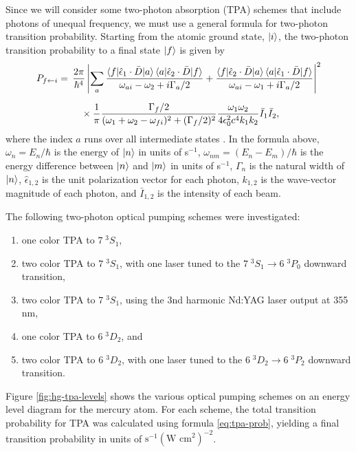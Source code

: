 \documentclass[12pt]{mitthesis}
\begin{document}
Since we will consider some two-photon absorption (TPA) schemes that
include photons of unequal frequency, we must use a general formula
for two-photon transition probability.  Starting from the atomic
ground state, $\mathinner{|{i}\rangle}$, the two-photon transition probability to a
final state $\mathinner{|{f}\rangle}$ is given by
\begin{equation}
  \label{eq:tpa-prob}
  \begin{split}
    P_{f \leftarrow i} = &\: \: \frac{2 \pi}{\hbar^4}
    \left \lvert
      \sum_a
      \frac{
        \mathinner{\langle{f|\hat{\epsilon}_1 \cdot \bar{D}|a}\rangle}\mathinner{\langle{a|\hat{\epsilon}_2 \cdot \bar{D}|f}\rangle}
      }{
        \omega_{ai} - \omega_2 + i \Gamma_a / 2
      } + \frac{
        \mathinner{\langle{f|\hat{\epsilon}_2 \cdot \bar{D}|a}\rangle}\mathinner{\langle{a|\hat{\epsilon}_1 \cdot \bar{D}|f}\rangle}
      }{
        \omega_{ai} - \omega_1 + i \Gamma_a / 2
      }
    \right \rvert ^2\\[2mm]
    & \: \: \: \: \: \: \times 
      \frac{1}{\pi} 
      \frac{
        \Gamma_f / 2
      }{
        (\omega_1 + \omega_2 - \omega_{fi})^2+(\Gamma_f/2)^2
      } \frac{
        \omega_1 \omega_2
      }{
        4 \epsilon_0^2 c^4 k_1 k_2
      } \bar{I}_1 \bar{I}_2,\\
  \end{split}
\end{equation}
where the index $a$ runs over all intermediate states \cite{bonin84,
  grynberg77}.  In the formula above, $\omega_n = E_n / \hbar$ is the
energy of $\mathinner{|{n}\rangle}$ in units of s$^{-1}$, $\omega_{nm} = (E_n -
E_m)/\hbar$ is the energy difference between $\mathinner{|{n}\rangle}$ and $\mathinner{|{m}\rangle}$
in units of s$^{-1}$, $\Gamma_n$ is the natural width of $\mathinner{|{n}\rangle}$,
$\hat{\epsilon}_{1,2}$ is the unit polarization vector for each
photon, $k_{1,2}$ is the wave-vector magnitude of each photon, and
$\bar{I}_{1,2}$ is the intensity of each beam.

The following two-photon optical pumping schemes were investigated: 
\renewcommand{\theenumi}{(\alph{enumi})}
\renewcommand{\labelenumi}{\theenumi}
\begin{enumerate}
  \item one color TPA to $7 \; ^3S_1$,
  \item two color TPA to $7 \; ^3S_1$, with one laser tuned to the
    $7 \; ^3S_1 \rightarrow 6 \; ^3P_0$ downward transition,
  \item two color TPA to $7 \; ^3S_1$, using the  3nd harmonic Nd:YAG
    laser output at 355 nm,
  \item one color TPA to $6 \; ^3D_2$, and
  \item two color TPA to $6 \; ^3D_2$, with one laser tuned to the
    $6 \; ^3D_2 \rightarrow 6 \; ^3P_2$ downward transition.
\end{enumerate}
Figure \ref{fig:hg-tpa-levels} shows the various optical pumping
schemes on an energy level diagram for the mercury atom.  For each
scheme, the total transition probability for TPA was calculated using
formula \ref{eq:tpa-prob}, yielding a final transition probability in
units of $\text{s}^{-1}(\text{W cm}^2)^{-2}$.  
\end{document}
